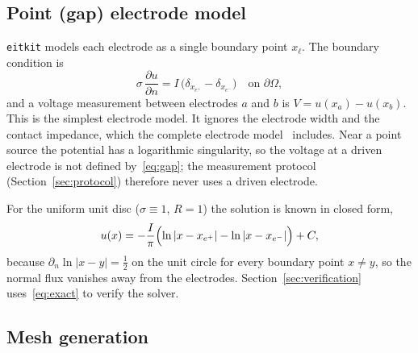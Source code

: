 \documentclass[11pt,a4paper]{article}
\begin{document}
\subsection{Point (gap) electrode model}

\texttt{eitkit} models each electrode as a single boundary point $x_\ell$.
The boundary condition is
\begin{equation}\label{eq:gap}
  \sigma\,\frac{\partial u}{\partial n} = I\,\bigl(\delta_{x_{e^+}} -
  \delta_{x_{e^-}}\bigr) \quad\text{on } \partial\Omega ,
\end{equation}
and a voltage measurement between electrodes $a$ and $b$ is
$V = u(x_a) - u(x_b)$. This is the simplest electrode model. It ignores the
electrode width and the contact impedance, which the complete electrode
model~\cite{SomersaloCheneyIsaacson1992} includes. Near a point source the
potential has a logarithmic singularity, so the voltage at a driven electrode
is not defined by~\eqref{eq:gap}; the measurement protocol
(Section~\ref{sec:protocol}) therefore never uses a driven electrode.

For the uniform unit disc ($\sigma\equiv1$, $R=1$) the solution is known in
closed form,
\begin{equation}\label{eq:exact}
  u(x) = -\frac{I}{\pi}\Bigl(\ln|x-x_{e^+}| - \ln|x-x_{e^-}|\Bigr) + C ,
\end{equation}
because $\partial_n\ln|x-y| = \tfrac12$ on the unit circle for every
boundary point $x\neq y$, so the normal flux vanishes away from the
electrodes. Section~\ref{sec:verification} uses~\eqref{eq:exact} to verify
the solver.

\subsection{Mesh generation}
\end{document}

